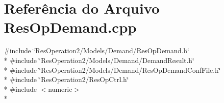 \section{Referência do Arquivo Res\+Op\+Demand.\+cpp}
\label{_res_op_demand_8cpp}
{\ttfamily \#include \char`\"{}Res\+Operation2/\+Models/\+Demand/\+Res\+Op\+Demand.\+h\char`\"{}}\\*
{\ttfamily \#include \char`\"{}Res\+Operation2/\+Models/\+Demand/\+Demand\+Result.\+h\char`\"{}}\\*
{\ttfamily \#include \char`\"{}Res\+Operation2/\+Models/\+Demand/\+Res\+Op\+Demand\+Conf\+File.\+h\char`\"{}}\\*
{\ttfamily \#include \char`\"{}Res\+Operation2/\+Res\+Op\+Ctrl.\+h\char`\"{}}\\*
{\ttfamily \#include $<$numeric$>$}\\*
